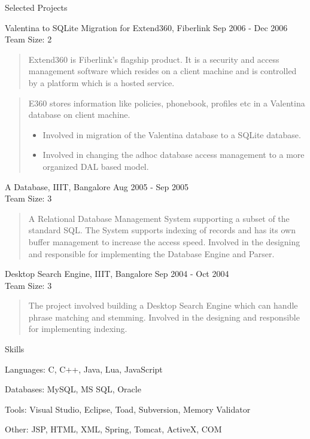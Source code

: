 \documentclass{resume}
\newcommand{\teamsize}{\\\sc\footnotesize Team Size: }
\begin{document}
\begin{category}{Selected Projects}{}
    \item {\topic Valentina to SQLite Migration for Extend360,} Fiberlink
        {\period Sep 2006 - Dec 2006}
        {\teamsize 2}
        \begin{quote}
            Extend360 is Fiberlink’s flagship product. It is a security and
            access management software which resides on a client machine and is
            controlled by a platform which is a hosted service.
        \end{quote}
        \begin{quote}
            E360 stores information like policies, phonebook, profiles etc in a
            Valentina database on client machine.
            \begin{itemize}
                \item Involved in migration of the Valentina database to a
                    SQLite database.
                \item Involved in changing the adhoc database access management
                    to a more organized DAL based model.
            \end{itemize}
        \end{quote}

    \item {\topic A Database,} IIIT, Bangalore %
        {\period Aug 2005 - Sep 2005}
	{\teamsize 3}
        \begin{quote}
            A Relational Database Management System supporting a subset of the
            standard SQL. The System supports indexing of records and has its
            own buffer management to increase the access speed.  Involved in
            the designing and responsible for implementing the Database Engine
            and Parser.
        \end{quote}

    \item {\topic Desktop Search Engine,} IIIT, Bangalore
        {\period Sep 2004 - Oct 2004}
	{\teamsize 3}
        \begin{quote}
            The project involved building a Desktop Search Engine which can
            handle phrase matching and stemming.  Involved in the designing and
            responsible for implementing indexing.
        \end{quote}

\end{category}


\begin{category}{Skills}{}

    \item {\topic Languages:} C, C++, Java, Lua, JavaScript
    \item {\topic Databases:} MySQL, MS SQL, Oracle
    \item {\topic Tools:} Visual Studio,  Eclipse, Toad, Subversion, Memory
        Validator
    \item {\topic Other:} JSP, HTML, XML, Spring, Tomcat,  ActiveX, COM

\end{category}
\end{document}
